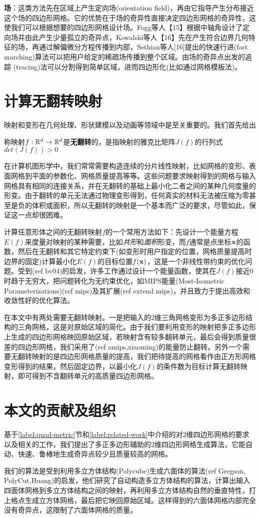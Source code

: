 \textbf{场}：这类方法先在区域上产生定向场(orientation field)，再由它指导产生分布接近这个场的四边形网格。它的优势在于场的奇异性直接决定四边形网格的奇异性，这使我们可以根据想要的四边形网格设计场。Fogg等人【15】根据中轴角设计了定向场并由此产生少量孤立的奇异点，Kowalski等人【16】先在产生符合边界几何特征的场，再通过解偏微分方程传播到内部，Sethian等人[16]提出的快速行进(fast marching)算法可以把用户给定的稀疏场传播到整个区域。由场的奇异点出发的追踪
(tracing)法可以分割得到简单区域，进而四边形化(比如通过网格模板法)。

\section{计算无翻转映射}\label{invertion-free}
映射和变形在几何处理、形状建模以及动画等领域中是至关重要的。我们首先给出
\begin{definition}\label{def:local-injective}
称映射$f:\mathbb{R}^d \rightarrow \mathbb{R}^d$是\textbf{无翻转}的，是指映射的雅克比矩阵$J(f)$的行列式$det(J(f))>0$
\end{definition}
在计算机图形学中，我们常常需要构造连续的分片线性映射，比如网格的变形、表面网格到平面的参数化、网格质量提高等等。这些问题要求映射得到的网格与输入网格具有相同的连接关系，并在无翻转的基础上最小化二者之间的某种几何度量的形变。由于翻转的单元无法通过物理变形得到，任何真实的材料无法被压缩为零甚至是负的体积或面积，所以无翻转的映射是一个基本而广泛的要求，尽管如此，保证这一点却很困难。

计算任意形体之间的无翻转映射$f$的一个常用方法如下：先设计一个能量方程$E(f)$来度量对映射的某种需要，比如\emph{共形}和\emph{面积}形变，而$f$通常是点坐标$\mathbf{x}$的函数，然后在无翻转和其它特定约束下(如变形时用户指定的位置，网格质量提高时边界的固定)计算最小化$E(f)$的目标位置$f(\mathbf{x})$，这是一个非线性带约束的优化问题。受到(ref bv04)的启发，许多工作通过设计一个能量函数，使其在$J(f)$接近0时趋于无穷大，把问题转化为无约束优化，如MIPS能量(Most-Isometric Parameterizations)(ref mips)及其扩展(ref extend mips)，并且致力于提出高效和收敛性好的优化算法。

在本文中有两处需要无翻转映射。一是把输入的2维三角网格变形为多正多边形结构的三角网格，这是对原始区域的简化。由于我们要利用变形的映射把多正多边形上生成的四边形网格映回原始区域，若映射含有较多翻转单元，最后会得到质量很差的四边形网格，我们采用了(ref amips,xiaoming)的能量防止翻转。另外一个需要无翻转映射的是四边形网格质量的提高，我们把待提高的网格看作由正方形网格变形得到的结果，然后固定边界，以最小化$J(f)$的条件数为目标计算无翻转映射，即可得到不含翻转单元的高质量四边形网格。


\section{本文的贡献及组织}\label{contri-organ}
基于\ref{label:quad-metric}节和\ref{label:related-work}中介绍的对2维四边形网格的要求以及相关的工作，我们提出了多正多边形辅助的2维四边形网格生成算法，它能自动、快速、鲁棒地生成奇异点较少且质量较高的网格。

我们的算法是受到利用多立方体结构(Polycube)生成六面体的算法(ref Gregson, PolyCut,Huang)的启发，他们研究了自动构造多立方体结构的算法，计算出输入四面体网格到多立方体结构之间的映射，再利用多立方体结构自然的垂直特性，打上格点生成立方体网格，最后把它映回原始区域。这样得到的六面体网格内部完全没有奇异点，这限制了六面体网格的质量。